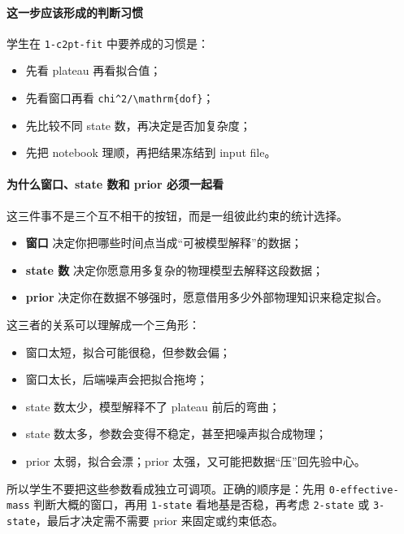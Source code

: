 \documentclass[11pt,a4paper,fontset=fandol]{ctexart}
\begin{document}
\paragraph{这一步应该形成的判断习惯}

学生在 \lstinline|1-c2pt-fit| 中要养成的习惯是：

\begin{itemize}[leftmargin=2em]
  \item 先看 plateau 再看拟合值；
  \item 先看窗口再看 \lstinline|chi^2/\mathrm{dof}|；
  \item 先比较不同 state 数，再决定是否加复杂度；
  \item 先把 notebook 理顺，再把结果冻结到 input file。
\end{itemize}

\paragraph{为什么窗口、state 数和 prior 必须一起看}

这三件事不是三个互不相干的按钮，而是一组彼此约束的统计选择。

\begin{itemize}[leftmargin=2em]
  \item \textbf{窗口} 决定你把哪些时间点当成“可被模型解释”的数据；
  \item \textbf{state 数} 决定你愿意用多复杂的物理模型去解释这段数据；
  \item \textbf{prior} 决定你在数据不够强时，愿意借用多少外部物理知识来稳定拟合。
\end{itemize}

这三者的关系可以理解成一个三角形：

\begin{itemize}[leftmargin=2em]
  \item 窗口太短，拟合可能很稳，但参数会偏；
  \item 窗口太长，后端噪声会把拟合拖垮；
  \item state 数太少，模型解释不了 plateau 前后的弯曲；
  \item state 数太多，参数会变得不稳定，甚至把噪声拟合成物理；
  \item prior 太弱，拟合会漂；prior 太强，又可能把数据“压”回先验中心。
\end{itemize}

所以学生不要把这些参数看成独立可调项。正确的顺序是：先用 \lstinline|0-effective-mass| 判断大概的窗口，再用 \lstinline|1-state| 看地基是否稳，再考虑 \lstinline|2-state| 或 \lstinline|3-state|，最后才决定需不需要 prior 来固定或约束低态。
\end{document}
